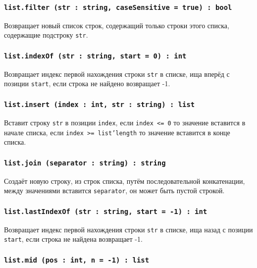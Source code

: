 \subsubsection{\texttt{list.filter (str : string, caseSensitive = true) : bool}}

Возвращает новый список строк, содержащий только строки этого списка, содержащие подстроку \texttt{str}. 

\subsubsection{\texttt{list.indexOf (str : string, start = 0) : int}}

Возвращает индекс первой нахождения строки \texttt{str} в списке, ища вперёд с позиции \texttt{start}, если строка не найдено возвращает -1.

\subsubsection{\texttt{list.insert (index : int, str : string) : list}}

Вставит строку \texttt{str} в позиции \texttt{index}, если \texttt{index <= 0} то значение вставится в начале списка, если \texttt{index >= list'length} то значение вставится в конце списка.

\subsubsection{\texttt{list.join (separator : string) : string}}

Создаёт новую строку, из строк списка, путём последовательной конкатенации, между значениями вставится \texttt{separator}, он может быть пустой строкой.

\subsubsection{\texttt{list.lastIndexOf (str : string, start = -1) : int}}

Возвращает индекс первой нахождения строки \texttt{str} в списке, ища назад с позиции \texttt{start}, если строка не найдена возвращает -1.

\subsubsection{\texttt{list.mid (pos : int, n = -1) : list}}

